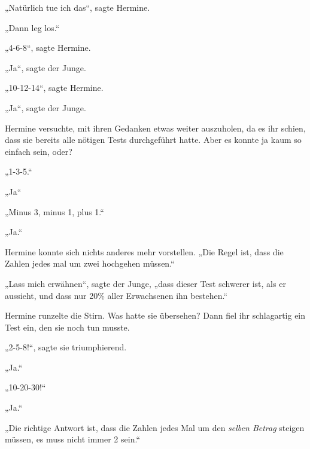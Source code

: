 „Natürlich tue ich das“, sagte Hermine.

„Dann leg los.“

„4-6-8“, sagte Hermine.

„Ja“, sagte der Junge.

„10-12-14“, sagte Hermine.

„Ja“, sagte der Junge.

Hermine versuchte, mit ihren Gedanken etwas weiter auszuholen, da es ihr schien, dass sie bereits alle nötigen Tests durchgeführt hatte. Aber es konnte ja kaum so einfach sein, oder?

„1-3-5.“

„Ja“

„Minus 3, minus 1, plus 1.“

„Ja.“

Hermine konnte sich nichts anderes mehr vorstellen. „Die Regel ist, dass die Zahlen jedes mal um zwei hochgehen müssen.“

„Lass mich erwähnen“, sagte der Junge, „dass dieser Test schwerer ist, als er aussieht, und dass nur 20\% aller Erwachsenen ihn bestehen.“

Hermine runzelte die Stirn. Was hatte sie übersehen? Dann fiel ihr schlagartig ein Test ein, den sie noch tun musste.

„2-5-8!“, sagte sie triumphierend.

„Ja.“

„10-20-30!“

„Ja.“

„Die richtige Antwort ist, dass die Zahlen jedes Mal um den \emph{selben Betrag} steigen müssen, es muss nicht immer 2 sein.“


